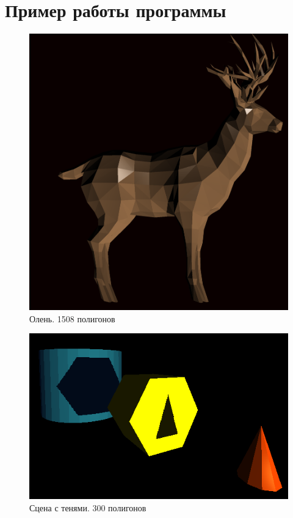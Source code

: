 \section{Пример работы программы}
\begin{figure}[H]
	\begin{center}
		\includegraphics[scale=0.33]{images/deer}
	\end{center}
	\captionsetup{justification=centering}
	\caption{Олень. 1508 полигонов}
	\label{img:s1}	
\end{figure}

\begin{figure}[H]
	\begin{center}
		\includegraphics[scale=0.5]{images/shadow}
	\end{center}
	\captionsetup{justification=centering}
	\caption{Сцена с тенями. 300 полигонов}
	\label{img:s1}	
\end{figure}


